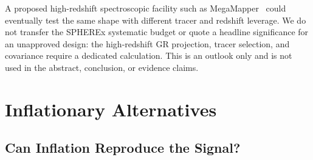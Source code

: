 \documentclass[aps,prd,twocolumn,superscriptaddress,showpacs,preprintnumbers,nofootinbib,longbibliography,floatfix]{revtex4-2}
\begin{document}
A proposed high-redshift spectroscopic facility such as MegaMapper~\cite{Schlegel:2022} could eventually test the same shape with different tracer and redshift leverage. We do not transfer the SPHEREx systematic budget or quote a headline significance for an unapproved design: the high-redshift GR projection, tracer selection, and covariance require a dedicated calculation. This is an outlook only and is not used in the abstract, conclusion, or evidence claims.
\section{Inflationary Alternatives}
\label{sec:bayesian}

\subsection{Can Inflation Reproduce the Signal?}
\end{document}

